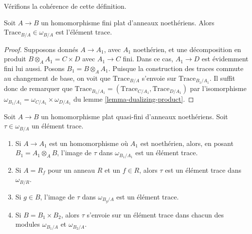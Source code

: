 \noindent
Vérifions la cohérence de cette définition.

\begin{lemma}
\label{lemma-finite-flat-trace}
Soit $A \to B$ un homomorphisme fini plat d'anneaux noethériens.
Alors $\text{Trace}_{B/A} \in \omega_{B/A}$ est l'élément trace.
\end{lemma}

\begin{proof}
Supposons donnés $A \to A_1$, avec $A_1$ noethérien, et
une décomposition en produit $B \otimes_A A_1 = C \times D$ avec $A_1 \to C$
fini. Dans ce cas, $A_1 \to D$ est évidemment fini lui aussi.
Posons $B_1 = B \otimes_A A_1$.
Puisque la construction des traces commute au changement de base,
on voit que $\text{Trace}_{B/A}$ s'envoie sur $\text{Trace}_{B_1/A_1}$.
Il suffit donc de remarquer que
$\text{Trace}_{B_1/A_1} = (\text{Trace}_{C/A_1}, \text{Trace}_{D/A_1})$
par l'isomorphisme
$\omega_{B_1/A_1} = \omega_{C/A_1} \times \omega_{D/A_1}$
du lemme \ref{lemma-dualizing-product}.
\end{proof}

\begin{lemma}
\label{lemma-trace-base-change}
Soit $A \to B$ un homomorphisme plat quasi-fini d'anneaux noethériens.
Soit $\tau \in \omega_{B/A}$ un élément trace.
\begin{enumerate}
\item Si $A \to A_1$ est un homomorphisme où $A_1$ est noethérien, alors, en posant
$B_1 = A_1 \otimes_A B$, l'image de $\tau$ dans $\omega_{B_1/A_1}$ est un
élément trace.
\item Si $A = R_f$ pour un anneau $R$ et un $f \in R$, alors
$\tau$ est un élément trace dans $\omega_{B/R}$.
\item Si $g \in B$, l'image de $\tau$ dans $\omega_{B_g/A}$
est un élément trace.
\item Si $B = B_1 \times B_2$, alors $\tau$ s'envoie sur un élément trace
dans chacun des modules $\omega_{B_1/A}$ et $\omega_{B_2/A}$.
\end{enumerate}
\end{lemma}

